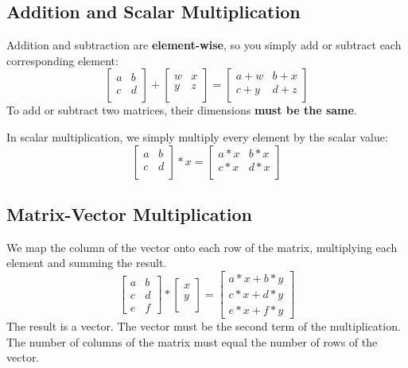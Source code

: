 \subsection*{Addition and Scalar Multiplication}
Addition and subtraction are {\bf element-wise}, so you simply add or subtract each corresponding element:
\[
\begin{bmatrix}  a & b \\   c & d \\  \end{bmatrix} +\begin{bmatrix}  w & x \\   y & z \\  \end{bmatrix} =\begin{bmatrix}  a+w & b+x \\   c+y & d+z \\ \end{bmatrix}
\]
To add or subtract two matrices, their dimensions {\bf must be the same}.

In scalar multiplication, we simply multiply every element by the scalar value:
\[
\begin{bmatrix}  a & b \\   c & d \\  \end{bmatrix} * x =\begin{bmatrix}  a*x & b*x \\   c*x & d*x \\ \end{bmatrix}
\]
\subsection*{Matrix-Vector Multiplication}
We map the column of the vector onto each row of the matrix, multiplying each element and summing the result.
\[
\begin{bmatrix}  a & b \\   c & d \\   e & f \end{bmatrix} *\begin{bmatrix}  x \\   y \\  \end{bmatrix} =\begin{bmatrix}  a*x + b*y \\   c*x + d*y \\   e*x + f*y\end{bmatrix}
\]
The result is a vector. The vector must be the second term of the multiplication. The number of columns of the matrix must equal the number of rows of the vector.

